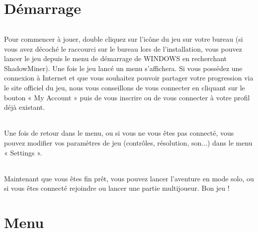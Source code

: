 \documentclass[titlepage, 13px, a4paper]{report}
\begin{document}
\part{Démarrage}
\paragraph*{} \hspace{0pt}
Pour commencer à jouer, double cliquez sur l’icône du jeu sur votre bureau (si vous avez décoché le raccourci sur 
le bureau lors de l'installation, vous pouvez lancer le jeu depuis le menu de démarrage de WINDOWS en recherchant ShadowMiner). 
Une fois le jeu lancé un menu s'affichera. Si vous possédez une connexion à Internet et que vous souhaitez pouvoir 
partager votre progression via le site officiel du jeu, nous vous conseillons de vous connecter en cliquant sur le 
bouton « My Account » puis de vous inscrire ou de vous connecter à votre profil déjà existant. \\


\paragraph*{} \hspace{0pt}
Une fois de retour dans le menu, ou si vous ne vous êtes pas connecté, vous pouvez modifier vos paramètres 
de jeu (contrôles, résolution, son...) dans le menu « Settings ». \\


\paragraph*{} \hspace{0pt}
Maintenant que vous êtes fin prêt, vous pouvez lancer l'aventure en mode solo, ou si vous êtes connecté rejoindre 
ou lancer une partie multijoueur. Bon jeu ! \\



\newpage


\part{Menu} 
\end{document}
